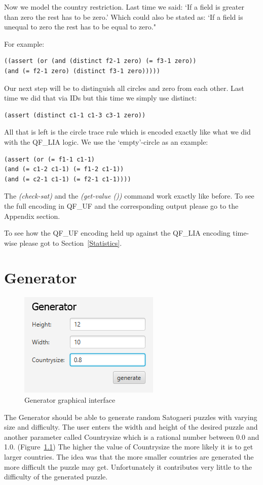 Now we model the country restriction. Last time we said: `If a field is greater than zero the rest has to be zero.' Which could also be stated as: `If a field is unequal to zero the rest has to be equal to zero."

For example:
\begin{lstlisting}
((assert (or (and (distinct f2-1 zero) (= f3-1 zero)) 
(and (= f2-1 zero) (distinct f3-1 zero)))))
\end{lstlisting}

Our next step will be to distinguish all circles and zero from each other. Last time we did that via IDs but this time we simply use distinct:
\begin{lstlisting}
(assert (distinct c1-1 c1-3 c3-1 zero))
\end{lstlisting}

All that is left is the circle trace rule which is encoded exactly like what we did with the QF\_LIA logic. We use the `empty'-circle as an example:
\begin{lstlisting}
(assert (or (= f1-1 c1-1) 
(and (= c1-2 c1-1) (= f1-2 c1-1)) 
(and (= c2-1 c1-1) (= f2-1 c1-1))))
\end{lstlisting}

The \emph{(check-sat)} and the \emph{(get-value ())} command work exactly like before. To see the full encoding in QF\_UF and the corresponding output please go to the Appendix section.

To see how the QF\_UF encoding held up against the QF\_LIA encoding time-wise please got to Section~\ref{Statistics}.

\chapter{Generator} \label{The Generator}
\begin{figure}
  \centering
  \includegraphics[scale=1]{Pictures/generator.png} 
  \caption{Generator graphical interface}
  \label{fig:generator}
\end{figure}
The Generator should be able to generate random Satogaeri puzzles with varying size and difficulty. The user enters the width and height of the desired puzzle and another parameter called Countrysize which is a rational number between 0.0 and 1.0. (Figure~\ref{fig:generator}) The higher the value of Countrysize the more likely it is to get larger countries. The idea was that the more smaller countries are generated the more difficult the puzzle may get. Unfortunately it contributes very little to the difficulty of the generated puzzle.

